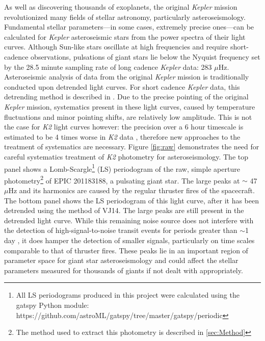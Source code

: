 \documentclass[useAMS, usenatbib, preprint, 12pt]{aastex}
\begin{document}
As well as discovering thousands of exoplanets, the original {\it Kepler}
mission revolutionized many fields of stellar astronomy, particularly
asteroseismology.
Fundamental stellar parameters---in some cases, extremely precise ones---can
be calculated for {\it Kepler} asteroseismic stars from the power spectra of
their light curves.
Although Sun-like stars oscillate at high frequencies and require
short-cadence observations, pulsations of giant stars lie below the Nyquist
frequency set by the 28.5 minute sampling rate of long cadence {\it Kepler}
data: 283 $\mu$Hz.
Asteroseismic analysis of data from the original {\it Kepler} mission is
traditionally conducted upon detrended light curves.
For short cadence {\it Kepler} data, this detrending method is described in
\citet{Garcia2011}.
Due to the precise pointing of the original {\it Kepler} mission, systematics
present in these light curves, caused by temperature fluctuations and minor
pointing shifts, are relatively low amplitude.
This is not the case for {\it K2} light curves however: the precision over a
6 hour timescale is estimated to be 4 times worse in {\it K2} data
\citep{Howell2014}, therefore new approaches to the treatment of systematics
are necessary.
Figure \ref{fig:raw} demonstrates the need for careful systematics treatment
of {\it K2} photometry for asteroseismology.
The top panel shows a Lomb-Scargle\footnote{All LS periodograms
produced in this project were calculated using the gatspy Python module:
https://github.com/astroML/gatspy/tree/master/gatspy/periodic} (LS) periodogram of the raw, simple aperture
photometry\footnote{The method used to extract this photometry is described in
\textsection \ref{sec:Method}} of EPIC 201183188, a pulsating giant star.
The large peaks at $\sim$ 47 $\mu$Hz and its harmonics are caused by the
regular thruster fires of the spacecraft.
The bottom panel shows the LS periodogram of this light curve, after
it has been detrended using the method of VJ14.
The large peaks are still present in the detrended light curve.
While this remaining noise source does not interfere with the detection of
high-signal-to-noise transit events for periods greater than $\sim$1 day
\citep{Vanderburg2015}, it does hamper the detection of
smaller signals, particularly on time scales comparable to that of thruster
fires.
These peaks lie in an important region of parameter space for giant star
asteroseismology and could affect the stellar parameters measured for thousands
of giants if not dealt with appropriately.
\end{document}

